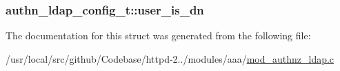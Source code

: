 \subsubsection[{\texorpdfstring{user\+\_\+is\+\_\+dn}{user_is_dn}}]{ authn\+\_\+ldap\+\_\+config\+\_\+t\+::user\+\_\+is\+\_\+dn}\hypertarget{structauthn__ldap__config__t_a09b9261f4c2f1ba2ee761458b80b87bf}{}\label{structauthn__ldap__config__t_a09b9261f4c2f1ba2ee761458b80b87bf}


The documentation for this struct was generated from the following file\+:\begin{DoxyCompactItemize}
\item 
/usr/local/src/github/\+Codebase/httpd-\/2../modules/aaa/\hyperlink{mod__authnz__ldap_8c}{mod\+\_\+authnz\+\_\+ldap.\+c}\end{DoxyCompactItemize}
